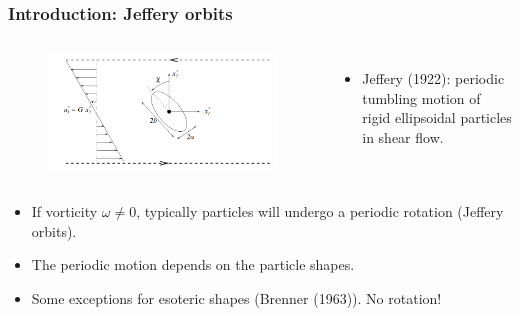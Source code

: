 \documentclass{beamer}
\newcommand{\bi}{\begin{itemize}}
\newcommand{\ei}{\end{itemize}}
\begin{document}
\begin{frame}
	\frametitle{Introduction: Jeffery orbits}
	\begin{overlayarea}{\textwidth}{\textheight}
		\vspace{-0.2cm}
		\begin{columns}
			\begin{figure}[htb]
				\begin{center}
					\includegraphics[width=1\textwidth]{plots/jeffery.png}
				\end{center}
			\end{figure}
			\small
			\bi
			\item Jeffery (1922): periodic tumbling motion of rigid ellipsoidal particles in shear flow.
			\ei 
		\end{columns}
		\vspace{0.5cm}
		\bi 
		\item If vorticity $\omega\neq 0$, typically particles will undergo a periodic rotation (Jeffery orbits).
		\item The periodic motion depends on the particle shapes.
		\item \alert{Some exceptions for esoteric shapes} (Brenner (1963)). No rotation!
		\ei

	\end{overlayarea}
\end{frame}

\end{document}
